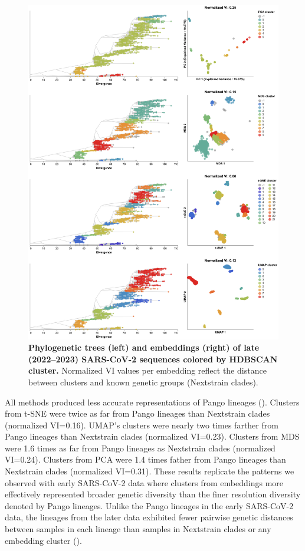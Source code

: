 \documentclass[10pt,letterpaper]{article}
\begin{document}
\begin{figure}[!h]
\includegraphics[width=\columnwidth]{figures/sarscov2-test-embeddings-by-cluster-vs-Nextstrain_clade.png}
\caption{{\bf Phylogenetic trees (left) and embeddings (right) of late (2022--2023) SARS-CoV-2 sequences colored by HDBSCAN cluster.}
  Normalized VI values per embedding reflect the distance between clusters and known genetic groups (Nextstrain clades).
}
\label{fig:sars-cov-2-2022-2023-clusters-vs-Nextstrain-clade}
\end{figure}

All methods produced less accurate representations of Pango lineages ().
Clusters from t-SNE were twice as far from Pango lineages than Nextstrain clades (normalized VI=0.16).
UMAP's clusters were nearly two times farther from Pango lineages than Nextstrain clades (normalized VI=0.23).
Clusters from MDS were 1.6 times as far from Pango lineages as Nextstrain clades (normalized VI=0.24).
Clusters from PCA were 1.4 times father from Pango lineages than Nextstrain clades (normalized VI=0.31).
These results replicate the patterns we observed with early SARS-CoV-2 data where clusters from embeddings more effectively represented broader genetic diversity than the finer resolution diversity denoted by Pango lineages.
Unlike the Pango lineages in the early SARS-CoV-2 data, the lineages from the later data exhibited fewer pairwise genetic distances between samples in each lineage than samples in Nextstrain clades or any embedding cluster ().
\end{document}
